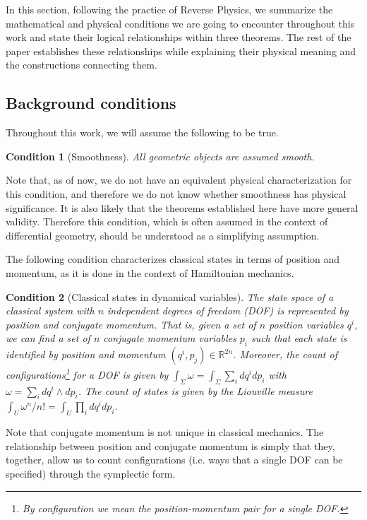 \documentclass[12pt]{article}
\newtheorem{condth}{Condition}
\renewcommand*{\thecondth}{\Roman{condth}}
\newenvironment{condition}[2][]{\renewcommand{\thecondth}{#2}\begin{condth}[#1]\label{#2}}{\end{condth}\renewcommand{\thecondth}{\Roman{condth}}}
\begin{document}
In this section, following the practice of Reverse Physics, we summarize the mathematical and physical conditions we are going to encounter throughout this work and state their logical relationships within three theorems. The rest of the paper establishes these relationships while explaining their physical meaning and the constructions connecting them.

\subsection{Background conditions}

Throughout this work, we will assume the following to be true.
\begin{condition}[Smoothness]{SM}
	All geometric objects are assumed smooth.
\end{condition}
Note that, as of now, we do not have an equivalent physical characterization for this condition, and therefore we do not know whether smoothness has physical significance. It is also likely that the theorems established here have more general validity. Therefore this condition, which is often assumed in the context of differential geometry, should be understood as a simplifying assumption.

The following condition characterizes classical states in terms of position and momentum, as it is done in the context of Hamiltonian mechanics.
\begin{condition}[Classical states in dynamical variables]{CSD}
	The state \linebreak space of a classical system with $n$ independent degrees of freedom (DOF) is represented by position and conjugate momentum. That is, given a set of $n$ position variables $q^i$, we can find a set of $n$ conjugate momentum variables $p_i$ such that each state is identified by position and momentum $(q^i,p_j) \in \mathbb{R}^{2n}$. Moreover, the count of configurations\footnote{By \emph{configuration} we mean the position-momentum pair for a single DOF.} for a DOF is given by $\int_{\Sigma} \omega = \int_{\Sigma} \sum_i dq^i dp_i$ with $\omega = \sum_i dq^i \wedge dp_i$. The count of states is given by the Liouville measure $\int_U \omega^n / n! = \int_U \prod_i dq^i dp_i$. 
\end{condition}
Note that conjugate momentum is not unique in classical mechanics. The relationship between position and conjugate momentum is simply that they, together, allow us to count configurations (i.e. ways that a single DOF can be specified) through the symplectic form.
\end{document}
